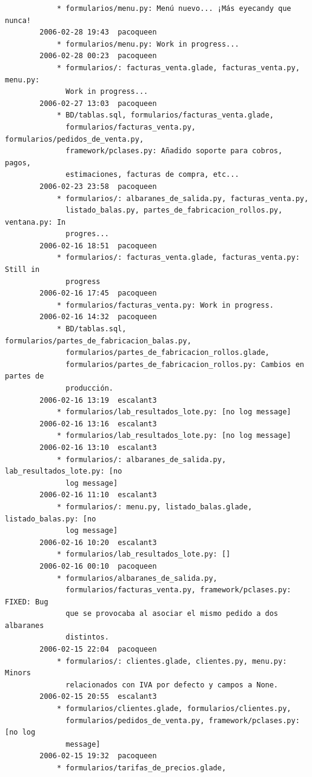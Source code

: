 \documentclass[a4paper]{article}
\begin{document}
\begin{verbatim}
            * formularios/menu.py: Menú nuevo... ¡Más eyecandy que nunca!
        2006-02-28 19:43  pacoqueen
            * formularios/menu.py: Work in progress...
        2006-02-28 00:23  pacoqueen
            * formularios/: facturas_venta.glade, facturas_venta.py, menu.py:
              Work in progress...
        2006-02-27 13:03  pacoqueen
            * BD/tablas.sql, formularios/facturas_venta.glade,
              formularios/facturas_venta.py, formularios/pedidos_de_venta.py,
              framework/pclases.py: Añadido soporte para cobros, pagos,
              estimaciones, facturas de compra, etc...
        2006-02-23 23:58  pacoqueen
            * formularios/: albaranes_de_salida.py, facturas_venta.py,
              listado_balas.py, partes_de_fabricacion_rollos.py, ventana.py: In
              progres...
        2006-02-16 18:51  pacoqueen
            * formularios/: facturas_venta.glade, facturas_venta.py: Still in
              progress
        2006-02-16 17:45  pacoqueen
            * formularios/facturas_venta.py: Work in progress.
        2006-02-16 14:32  pacoqueen
            * BD/tablas.sql, formularios/partes_de_fabricacion_balas.py,
              formularios/partes_de_fabricacion_rollos.glade,
              formularios/partes_de_fabricacion_rollos.py: Cambios en partes de
              producción.
        2006-02-16 13:19  escalant3
            * formularios/lab_resultados_lote.py: [no log message]
        2006-02-16 13:16  escalant3
            * formularios/lab_resultados_lote.py: [no log message]
        2006-02-16 13:10  escalant3
            * formularios/: albaranes_de_salida.py, lab_resultados_lote.py: [no
              log message]
        2006-02-16 11:10  escalant3
            * formularios/: menu.py, listado_balas.glade, listado_balas.py: [no
              log message]
        2006-02-16 10:20  escalant3
            * formularios/lab_resultados_lote.py: []
        2006-02-16 00:10  pacoqueen
            * formularios/albaranes_de_salida.py,
              formularios/facturas_venta.py, framework/pclases.py: FIXED: Bug
              que se provocaba al asociar el mismo pedido a dos albaranes
              distintos.
        2006-02-15 22:04  pacoqueen
            * formularios/: clientes.glade, clientes.py, menu.py: Minors
              relacionados con IVA por defecto y campos a None.
        2006-02-15 20:55  escalant3
            * formularios/clientes.glade, formularios/clientes.py,
              formularios/pedidos_de_venta.py, framework/pclases.py: [no log
              message]
        2006-02-15 19:32  pacoqueen
            * formularios/tarifas_de_precios.glade,

\end{verbatim}
\end{document}
